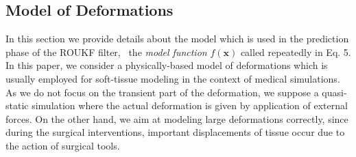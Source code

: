 
\def\bp{\mathbf{p}}
\def\be{\mathbf{e}}
\def\bff{\mathbf{p}}
\def\bfo{\mathbf{p}}
\def\bu{\mathbf{u}}
\def\bx{\mathbf{x}}
\def\bK{\mathbf{A}}
\def\bt{\mathbf{t}}
\def\bR{\mathbf{R}}
\def\bO{\mathbf{O}}
\def\bB{\mathbf{B}}
\def\bL{\mathbf{L}}
\def\bJ{\mathbf{J}}
\def\bF{\mathbf{F}}
\def\br{\mathbf{r}}

\subsection{Model of Deformations}
\label{sm:model}
In this section we provide details about the model which is used in the prediction phase of the ROUKF filter, \ie\ the 
\emph{model function} $f(\mathbf{x})$ called repeatedly in Eq. 5.
In this paper, we consider a physically-based model of deformations which is usually employed for soft-tissue modeling 
in the context of medical simulations.
As we do not focus on the transient part of the deformation, we suppose a quasi-static simulation where 
the actual deformation is given by application of external forces. On the other hand, we aim at modeling large deformations correctly, since
during the surgical interventions, important displacements of tissue occur due to the action of surgical tools.

